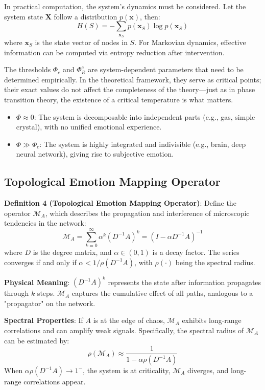 \documentclass[12pt,a4paper]{article}
\theoremstyle{plain}
\begin{document}
In practical computation, the system's dynamics must be considered. Let the system state $\mathbf{X}$ follow a distribution $p(\mathbf{x})$, then:
\begin{equation}
H(S) = -\sum_{\mathbf{x}_S} p(\mathbf{x}_S) \log p(\mathbf{x}_S)
\end{equation}
where $\mathbf{x}_S$ is the state vector of nodes in $S$. For Markovian dynamics, effective information can be computed via entropy reduction after intervention.

The thresholds $\Phi_c$ and $\Phi_R^c$ are system-dependent parameters that need to be determined empirically. In the theoretical framework, they serve as critical points; their exact values do not affect the completeness of the theory—just as in phase transition theory, the existence of a critical temperature is what matters.

\begin{itemize}
    \item $\Phi \approx 0$: The system is decomposable into independent parts (e.g., gas, simple crystal), with no unified emotional experience.
    \item $\Phi \gg \Phi_c$: The system is highly integrated and indivisible (e.g., brain, deep neural network), giving rise to subjective emotion.
\end{itemize}

\subsection{Topological Emotion Mapping Operator}

\textbf{Definition 4 (Topological Emotion Mapping Operator)}: Define the operator $\mathcal{M}_A$, which describes the propagation and interference of microscopic tendencies in the network:
\begin{equation}
\mathcal{M}_A = \sum_{k=0}^{\infty} \alpha^k (D^{-1}A)^k = (I - \alpha D^{-1}A)^{-1}
\end{equation}
where $D$ is the degree matrix, and $\alpha \in (0,1)$ is a decay factor. The series converges if and only if $\alpha < 1/\rho(D^{-1}A)$, with $\rho(\cdot)$ being the spectral radius.

\textbf{Physical Meaning}: $(D^{-1}A)^k$ represents the state after information propagates through $k$ steps. $\mathcal{M}_A$ captures the cumulative effect of all paths, analogous to a "propagator" on the network.

\textbf{Spectral Properties}: If $A$ is at the edge of chaos, $\mathcal{M}_A$ exhibits long-range correlations and can amplify weak signals. Specifically, the spectral radius of $\mathcal{M}_A$ can be estimated by:
\begin{equation}
\rho(\mathcal{M}_A) \approx \frac{1}{1 - \alpha \rho(D^{-1}A)}
\end{equation}
When $\alpha \rho(D^{-1}A) \to 1^-$, the system is at criticality, $\mathcal{M}_A$ diverges, and long-range correlations appear.
\end{document}
